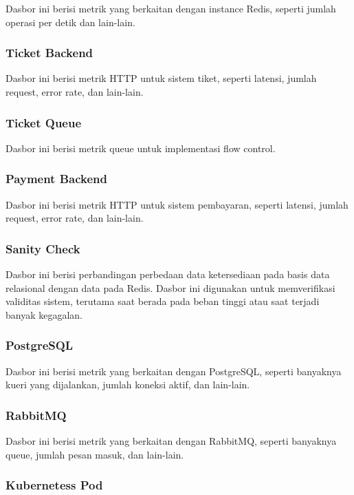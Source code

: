 Dasbor ini berisi metrik yang berkaitan dengan instance Redis, seperti jumlah operasi per detik dan lain-lain.

\subsubsection{Ticket Backend}

Dasbor ini berisi metrik HTTP untuk sistem tiket, seperti latensi, jumlah request, error rate, dan lain-lain.

\subsubsection{Ticket Queue}

Dasbor ini berisi metrik queue untuk implementasi flow control.

\subsubsection{Payment Backend}

Dasbor ini berisi metrik HTTP untuk sistem pembayaran, seperti latensi, jumlah request, error rate, dan lain-lain.

\subsubsection{Sanity Check}

Dasbor ini berisi perbandingan perbedaan data ketersediaan pada basis data relasional dengan data pada Redis. Dasbor ini digunakan untuk memverifikasi validitas sistem, terutama saat berada pada beban tinggi atau saat terjadi banyak kegagalan.

\subsubsection{PostgreSQL}

Dasbor ini berisi metrik yang berkaitan dengan PostgreSQL, seperti banyaknya kueri yang dijalankan, jumlah koneksi aktif, dan lain-lain.

\subsubsection{RabbitMQ}

Dasbor ini berisi metrik yang berkaitan dengan RabbitMQ, seperti banyaknya queue, jumlah pesan masuk, dan lain-lain.

\subsubsection{Kubernetess Pod}

